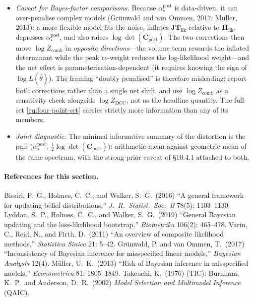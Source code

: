 \documentclass[11pt]{article}
\begin{document}
\begin{itemize}
likelihood model itself should be revisited.
\item \emph{Caveat for Bayes-factor comparisons.} Because
$\alpha_\star^{\mathrm{post}}$ is data-driven, it can over-penalise complex
models (Gr\"unwald and van Ommen, 2017; M\"uller, 2013): a more flexible
model fits the noise, inflates $\mathbf{JT}_{\mathrm{lik}}$ relative to
$\mathbf H_{\mathrm{lik}}$, depresses $\alpha_\star^{\mathrm{post}}$, and also
raises $\log\det(\mathbf C_{\mathrm{post}})$. The two corrections then move
$\log Z_{\mathrm{comb}}$ in \emph{opposite directions}---the volume term
rewards the inflated determinant while the peak re-weight reduces the
log-likelihood weight---and the net effect is parameterisation-dependent
(it requires knowing the sign of $\log L(\hat\theta)$). The framing
``doubly penalised'' is therefore misleading; report both corrections rather
than a single net shift, and use $\log Z_{\mathrm{comb}}$ as a sensitivity
check alongside $\log Z_{\mathrm{DCC}}$, not as the headline quantity. The
full set \eqref{eq:four-point-set} carries strictly more information than any
of its members.
\item \emph{Joint diagnostic.} The minimal informative summary of the
distortion is the pair
$\bigl(\alpha_\star^{\mathrm{post}},\,
\tfrac{1}{2}\log\det(\mathbf C_{\mathrm{post}})\bigr)$:
arithmetic mean against geometric mean of the same spectrum, with the
strong-prior caveat of \S10.4.1 attached to both.
\end{itemize}

\paragraph{References for this section.}
Bissiri, P.~G., Holmes, C.~C., and Walker, S.~G.\ (2016) ``A general framework
for updating belief distributions,'' \emph{J.~R.~Statist.~Soc.~B} 78(5):
1103--1130.\;
Lyddon, S.~P., Holmes, C.~C., and Walker, S.~G.\ (2019) ``General Bayesian
updating and the loss-likelihood bootstrap,'' \emph{Biometrika} 106(2):
465--478.\;
Varin, C., Reid, N., and Firth, D.\ (2011) ``An overview of composite
likelihood methods,'' \emph{Statistica Sinica} 21: 5--42.\;
Gr\"unwald, P. and van Ommen, T.\ (2017) ``Inconsistency of Bayesian
inference for misspecified linear models,'' \emph{Bayesian Analysis} 12(4).\;
M\"uller, U.~K.\ (2013) ``Risk of Bayesian inference in misspecified
models,'' \emph{Econometrica} 81: 1805--1849.\;
Takeuchi, K.\ (1976) (TIC); Burnham, K.~P.\ and Anderson, D.~R.\ (2002)
\emph{Model Selection and Multimodel Inference} (QAIC).
\end{document}
